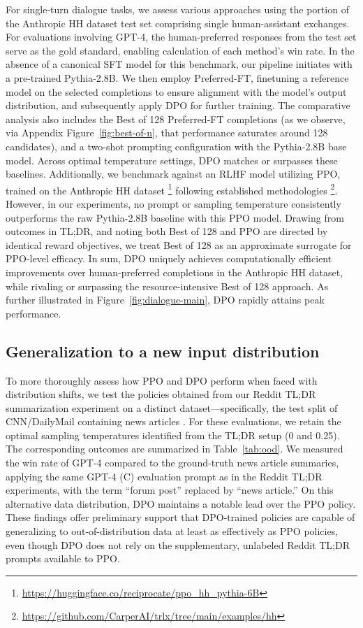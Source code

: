 For single-turn dialogue tasks, we assess various approaches using the portion of the Anthropic HH dataset \citep{bai2022training} test set comprising single human-assistant exchanges. For evaluations involving GPT-4, the human-preferred responses from the test set serve as the gold standard, enabling calculation of each method’s win rate. In the absence of a canonical SFT model for this benchmark, our pipeline initiates with a pre-trained Pythia-2.8B. We then employ Preferred-FT, finetuning a reference model on the selected completions to ensure alignment with the model’s output distribution, and subsequently apply DPO for further training. The comparative analysis also includes the Best of 128 Preferred-FT completions (as we observe, via Appendix Figure~\ref{fig:best-of-n}, that performance saturates around 128 candidates), and a two-shot prompting configuration with the Pythia-2.8B base model. Across optimal temperature settings, DPO matches or surpasses these baselines. Additionally, we benchmark against an RLHF model utilizing PPO, trained on the Anthropic HH dataset \footnote{\url{https://huggingface.co/reciprocate/ppo_hh_pythia-6B}} following established methodologies \footnote{\url{https://github.com/CarperAI/trlx/tree/main/examples/hh}}. However, in our experiments, no prompt or sampling temperature consistently outperforms the raw Pythia-2.8B baseline with this PPO model. Drawing from outcomes in TL;DR, and noting both Best of 128 and PPO are directed by identical reward objectives, we treat Best of 128 as an approximate surrogate for PPO-level efficacy. In sum, DPO uniquely achieves computationally efficient improvements over human-preferred completions in the Anthropic HH dataset, while rivaling or surpassing the resource-intensive Best of 128 approach. As further illustrated in Figure~\ref{fig:dialogue-main}, DPO rapidly attains peak performance.

\subsection{Generalization to a new input distribution}

To more thoroughly assess how PPO and DPO perform when faced with distribution shifts, we test the policies obtained from our Reddit TL;DR summarization experiment on a distinct dataset—specifically, the test split of CNN/DailyMail containing news articles \citep{nallapati-etal-2016-abstractive}. For these evaluations, we retain the optimal sampling temperatures identified from the TL;DR setup (0 and 0.25). The corresponding outcomes are summarized in Table~\ref{tab:ood}. We measured the win rate of GPT-4 compared to the ground-truth news article summaries, applying the same GPT-4 (C) evaluation prompt as in the Reddit TL;DR experiments, with the term ``forum post'' replaced by ``news article.'' On this alternative data distribution, DPO maintains a notable lead over the PPO policy. These findings offer preliminary support that DPO-trained policies are capable of generalizing to out-of-distribution data at least as effectively as PPO policies, even though DPO does not rely on the supplementary, unlabeled Reddit TL;DR prompts available to PPO.

